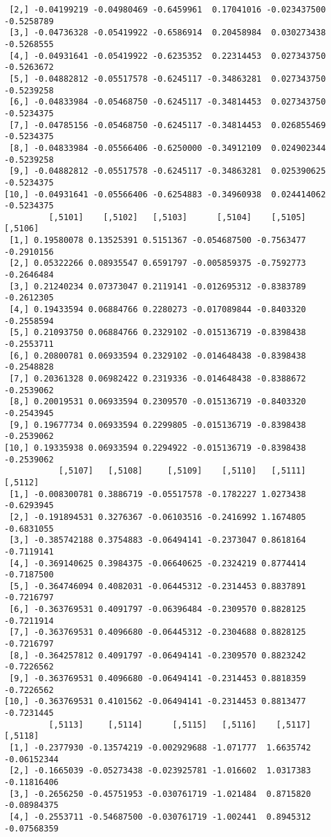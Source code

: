 \documentclass[
  letterpaper,
  DIV=11,
  numbers=noendperiod]{scrreprt}
\begin{document}
\begin{verbatim}
 [2,] -0.04199219 -0.04980469 -0.6459961  0.17041016 -0.023437500 -0.5258789
 [3,] -0.04736328 -0.05419922 -0.6586914  0.20458984  0.030273438 -0.5268555
 [4,] -0.04931641 -0.05419922 -0.6235352  0.22314453  0.027343750 -0.5263672
 [5,] -0.04882812 -0.05517578 -0.6245117 -0.34863281  0.027343750 -0.5239258
 [6,] -0.04833984 -0.05468750 -0.6245117 -0.34814453  0.027343750 -0.5234375
 [7,] -0.04785156 -0.05468750 -0.6245117 -0.34814453  0.026855469 -0.5234375
 [8,] -0.04833984 -0.05566406 -0.6250000 -0.34912109  0.024902344 -0.5239258
 [9,] -0.04882812 -0.05517578 -0.6245117 -0.34863281  0.025390625 -0.5234375
[10,] -0.04931641 -0.05566406 -0.6254883 -0.34960938  0.024414062 -0.5234375
         [,5101]    [,5102]   [,5103]      [,5104]    [,5105]    [,5106]
 [1,] 0.19580078 0.13525391 0.5151367 -0.054687500 -0.7563477 -0.2910156
 [2,] 0.05322266 0.08935547 0.6591797 -0.005859375 -0.7592773 -0.2646484
 [3,] 0.21240234 0.07373047 0.2119141 -0.012695312 -0.8383789 -0.2612305
 [4,] 0.19433594 0.06884766 0.2280273 -0.017089844 -0.8403320 -0.2558594
 [5,] 0.21093750 0.06884766 0.2329102 -0.015136719 -0.8398438 -0.2553711
 [6,] 0.20800781 0.06933594 0.2329102 -0.014648438 -0.8398438 -0.2548828
 [7,] 0.20361328 0.06982422 0.2319336 -0.014648438 -0.8388672 -0.2539062
 [8,] 0.20019531 0.06933594 0.2309570 -0.015136719 -0.8403320 -0.2543945
 [9,] 0.19677734 0.06933594 0.2299805 -0.015136719 -0.8398438 -0.2539062
[10,] 0.19335938 0.06933594 0.2294922 -0.015136719 -0.8398438 -0.2539062
           [,5107]   [,5108]     [,5109]    [,5110]   [,5111]    [,5112]
 [1,] -0.008300781 0.3886719 -0.05517578 -0.1782227 1.0273438 -0.6293945
 [2,] -0.191894531 0.3276367 -0.06103516 -0.2416992 1.1674805 -0.6831055
 [3,] -0.385742188 0.3754883 -0.06494141 -0.2373047 0.8618164 -0.7119141
 [4,] -0.369140625 0.3984375 -0.06640625 -0.2324219 0.8774414 -0.7187500
 [5,] -0.364746094 0.4082031 -0.06445312 -0.2314453 0.8837891 -0.7216797
 [6,] -0.363769531 0.4091797 -0.06396484 -0.2309570 0.8828125 -0.7211914
 [7,] -0.363769531 0.4096680 -0.06445312 -0.2304688 0.8828125 -0.7216797
 [8,] -0.364257812 0.4091797 -0.06494141 -0.2309570 0.8823242 -0.7226562
 [9,] -0.363769531 0.4096680 -0.06494141 -0.2314453 0.8818359 -0.7226562
[10,] -0.363769531 0.4101562 -0.06494141 -0.2314453 0.8813477 -0.7231445
         [,5113]     [,5114]      [,5115]   [,5116]    [,5117]     [,5118]
 [1,] -0.2377930 -0.13574219 -0.002929688 -1.071777  1.6635742 -0.06152344
 [2,] -0.1665039 -0.05273438 -0.023925781 -1.016602  1.0317383 -0.11816406
 [3,] -0.2656250 -0.45751953 -0.030761719 -1.021484  0.8715820 -0.08984375
 [4,] -0.2553711 -0.54687500 -0.030761719 -1.002441  0.8945312 -0.07568359

\end{verbatim}
\end{document}
